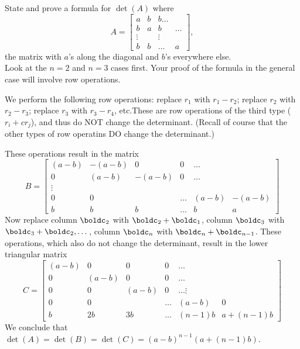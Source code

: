 \ii State and prove a formula for $\det(A)$ where 
\[
A=\begin{bmatrix}
a&b&b\dots \\
b&a&b&\dots\\
\vdots & &\vdots \\
b&b&\dots &a
\end{bmatrix},
\]
the matrix with $a$'s along the diagonal and $b$'s everywhere else. 
\\
Look at the $n=2$ and $n=3$ cases first. Your proof of the formula in the general case will involve row operations. 
\\
\begin{solution}
\noindent We perform the following row operations: replace $r_1$ with $r_1-r_2$; replace $r_2$ with $r_2-r_3$; replace $r_3$ with $r_3-r_4$, etc.These are row operations of the third type ($r_i+cr_j$), and thus do NOT change the determinant. (Recall of course that the other types of row operatins DO change the determinant.)

These operations result in the matrix
\[B=
\begin{bmatrix}
(a-b)&-(a-b)&0&0&\dots\\
0&(a-b)&-(a-b)&0&\dots\\
\vdots\\
0&0&&\dots& (a-b)&-(a-b)\\
b&b&b&\dots &b &a
\end{bmatrix}
\]
Now replace column $\boldc_2$ with $\boldc_2+\boldc_1$, column $\boldc_3$ with $\boldc_3+\boldc_2, \dots$, column $\boldc_n$ with $\boldc_n+\boldc_{n-1}$. These operations, which also do not change the determinant, result in the lower triangular matrix 
\[
C=\begin{bmatrix}
(a-b)&0&0&0&\dots\\
0&(a-b)&0&0&\dots\\
0&0&(a-b)&0&\dots
\vdots\\
0&0&&\dots& (a-b)&0\\
b&2b&3b&\dots &(n-1)b &a+(n-1)b
\end{bmatrix}
\]
We conclude that $\det(A)=\det(B)=\det(C)=(a-b)^{n-1}(a+(n-1)b)$. 

\end{solution}

